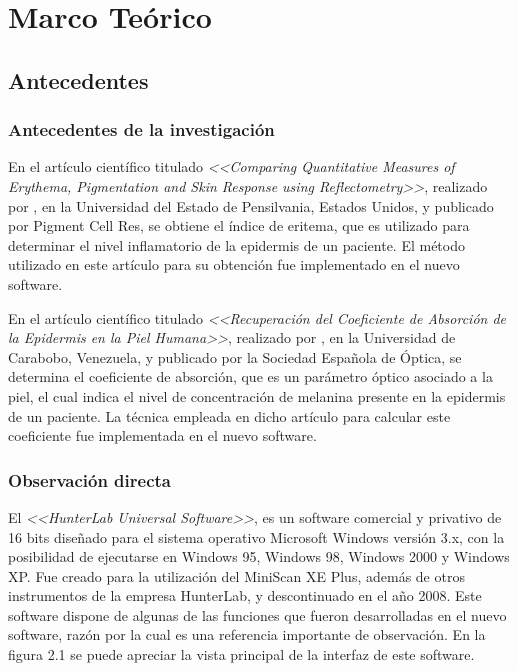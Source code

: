 \chapter{Marco Te\'{o}rico}

\capII

	\section{Antecedentes}
	
		\subsection{Antecedentes de la investigaci\'{o}n}
			
			En el art\'{i}culo cient\'{i}fico titulado \textit{<<Comparing Quantitative Measures of Erythema, Pigmentation and Skin Response using Reflectometry>>}, realizado por \cite{Wagner}, en la Universidad del Estado de Pensilvania, Estados Unidos, y publicado por Pigment Cell Res, se obtiene el \'{i}ndice de eritema, que es utilizado para determinar el nivel inflamatorio de la epidermis de un paciente. El m\'{e}todo utilizado en este art\'{i}culo para su obtenci\'{o}n fue implementado en el nuevo software.
			
			En el art\'{i}culo cient\'{i}fico titulado \textit{<<Recuperaci\'{o}n del Coeficiente de Absorci\'{o}n de la Epidermis en la Piel Humana>>}, realizado por \cite{Narea}, en la Universidad de Carabobo, Venezuela, y publicado por la Sociedad Espa\~{n}ola de \'{O}ptica, se determina el coeficiente de absorci\'{o}n, que es un par\'{a}metro \'{o}ptico asociado a la piel, el cual indica el nivel de concentraci\'{o}n de melanina presente en la epidermis de un paciente. La t\'{e}cnica empleada en dicho art\'{i}culo para calcular este coeficiente fue implementada en el nuevo software.

	\subsection{Observaci\'{o}n directa}
		
			El \textit{<<HunterLab Universal Software>>}, es un software comercial y privativo de 16 bits dise\~{n}ado para el sistema operativo Microsoft Windows versi\'{o}n 3.x, con la posibilidad de ejecutarse en Windows 95, Windows 98, Windows 2000 y Windows XP. Fue creado para la utilizaci\'{o}n del MiniScan XE Plus, adem\'{a}s de otros instrumentos de la empresa HunterLab, y descontinuado en el a\~{n}o 2008. Este software dispone de algunas de las funciones que fueron desarrolladas en el nuevo software, raz\'{o}n por la cual es una referencia importante de observaci\'{o}n. En la figura 2.1 se puede apreciar la vista principal de la interfaz de este software.
			
